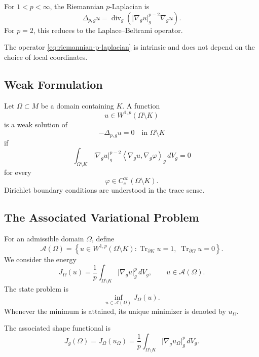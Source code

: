 \documentclass[11pt,a4paper]{article}
\theoremstyle{definition}
\theoremstyle{remark}
\newcommand{\divg}{\operatorname{div}_g}
\newcommand{\gradg}{\nabla_g}
\newcommand{\plapg}{\Delta_{p,g}}
\newcommand{\normg}[1]{\lvert #1\rvert_g}
\newcommand{\ipg}[2]{\left\langle #1,#2\right\rangle_g}
\begin{document}
For $1<p<\infty$, the Riemannian $p$-Laplacian is
\begin{equation}
\plapg u
=
\divg\!\left(
\normg{\gradg u}^{p-2}\gradg u
\right).
\label{eq:riemannian-p-laplacian}
\end{equation}
For $p=2$, this reduces to the Laplace--Beltrami operator.

The operator \eqref{eq:riemannian-p-laplacian} is intrinsic and does
not depend on the choice of local coordinates.

\subsection{Weak Formulation}

Let $\Omega\subset M$ be a domain containing $K$. A function
\[
u\in W^{1,p}(\Omega\setminus K)
\]
is a weak solution of
\[
-\plapg u=0
\quad\text{in }\Omega\setminus K
\]
if
\begin{equation}
\int_{\Omega\setminus K}
\normg{\gradg u}^{p-2}
\ipg{\gradg u}{\gradg\varphi}
\,dV_g
=
0
\label{eq:weak-state}
\end{equation}
for every
\[
\varphi\in C_c^\infty(\Omega\setminus K).
\]
Dirichlet boundary conditions are understood in the trace sense.

\subsection{The Associated Variational Problem}

For an admissible domain $\Omega$, define
\[
\mathcal{A}(\Omega)
=
\left\{
u\in W^{1,p}(\Omega\setminus K):
\operatorname{Tr}_{\partial K}u=1,\;
\operatorname{Tr}_{\partial\Omega}u=0
\right\}.
\]
We consider the energy
\begin{equation}
J_\Omega(u)
=
\frac1p
\int_{\Omega\setminus K}
\normg{\gradg u}^{p}\,dV_g,
\qquad
u\in\mathcal{A}(\Omega).
\label{eq:state-energy}
\end{equation}
The state problem is
\begin{equation}
\inf_{u\in\mathcal{A}(\Omega)}J_\Omega(u).
\label{eq:state-minimization}
\end{equation}
Whenever the minimum is attained, its unique minimizer is denoted by
$u_\Omega$.

The associated shape functional is
\begin{equation}
J_g(\Omega)
=
J_\Omega(u_\Omega)
=
\frac1p
\int_{\Omega\setminus K}
\normg{\gradg u_\Omega}^{p}\,dV_g.
\label{eq:shape-functional}
\end{equation}
\end{document}
